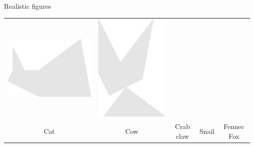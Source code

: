 \documentclass[14pt]{beamer}
\begin{document}
\begin{frame}{Realistic figures}
\begin{center}
{\begin{tabular}{ccccc}
                \includegraphics[scale=0.20]{figures/figure026ac.pdf} &
                \includegraphics[scale=0.20]{figures/figure026ap.pdf}  \\
                Cat & Cow\;\; & \!\!\!\!Crab claw & Snail & Fennec Fox \\[1.5ex]

\end{tabular}}
\end{center}
\end{frame}
\end{document}

